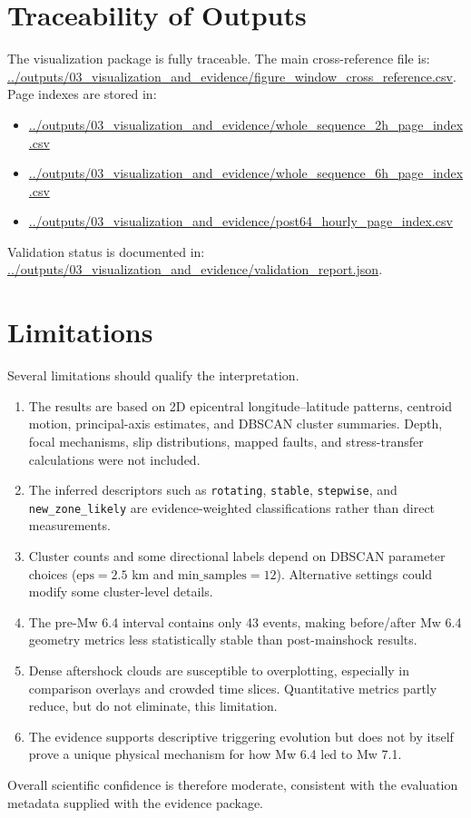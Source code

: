 \documentclass[11pt]{article}
\begin{document}
\section{Traceability of Outputs}
The visualization package is fully traceable. The main cross-reference file is:
\url{../outputs/03_visualization_and_evidence/figure_window_cross_reference.csv}.
Page indexes are stored in:
\begin{itemize}[leftmargin=1.5em]
    \item \url{../outputs/03_visualization_and_evidence/whole_sequence_2h_page_index.csv}
    \item \url{../outputs/03_visualization_and_evidence/whole_sequence_6h_page_index.csv}
    \item \url{../outputs/03_visualization_and_evidence/post64_hourly_page_index.csv}
\end{itemize}
Validation status is documented in:
\url{../outputs/03_visualization_and_evidence/validation_report.json}.

\section{Limitations}
Several limitations should qualify the interpretation.
\begin{enumerate}[leftmargin=1.5em]
    \item The results are based on 2D epicentral longitude--latitude patterns, centroid motion, principal-axis estimates, and DBSCAN cluster summaries. Depth, focal mechanisms, slip distributions, mapped faults, and stress-transfer calculations were not included.
    \item The inferred descriptors such as \texttt{rotating}, \texttt{stable}, \texttt{stepwise}, and \texttt{new\_zone\_likely} are evidence-weighted classifications rather than direct measurements.
    \item Cluster counts and some directional labels depend on DBSCAN parameter choices ($\mathrm{eps}=2.5$ km and $\mathrm{min\_samples}=12$). Alternative settings could modify some cluster-level details.
    \item The pre-Mw 6.4 interval contains only 43 events, making before/after Mw 6.4 geometry metrics less statistically stable than post-mainshock results.
    \item Dense aftershock clouds are susceptible to overplotting, especially in comparison overlays and crowded time slices. Quantitative metrics partly reduce, but do not eliminate, this limitation.
    \item The evidence supports descriptive triggering evolution but does not by itself prove a unique physical mechanism for how Mw 6.4 led to Mw 7.1.
\end{enumerate}
Overall scientific confidence is therefore moderate, consistent with the evaluation metadata supplied with the evidence package.
\end{document}
